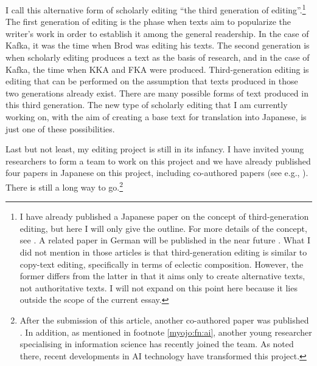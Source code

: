 \documentclass{article}
\begin{document}
I call this alternative form of scholarly editing ``the third generation
of editing''.\footnote{I have already published a Japanese paper on the
  concept of third-generation editing, but here I will only give the
  outline. For more details of the concept, see \cite{myojo_daisansedai_2021}. A related paper in German will be published in the near future \citep[see][]{myojo_editionspraxis_forthcoming}. What I did
  not mention in those articles is that third-generation editing is
  similar to copy-text editing, specifically in terms of eclectic
  composition. However, the former differs from the latter in that it
  aims only to create alternative texts, not authoritative texts. I will
  not expand on this point here because it lies outside the scope of the
  current essay.} The first generation of editing is the phase when
texts aim to popularize the writer's work in order to establish it among
the general readership. In the case of Kafka, it was the time when Brod
was editing his texts. The second generation is when scholarly
editing produces a text as the basis of research, and in the case of
Kafka, the time when KKA and FKA were produced. Third-generation editing
is editing that can be performed on the assumption that texts produced
in those two generations already exist. There are many possible forms of
text produced in this third generation. The new type of scholarly
editing that I am currently working on, with the aim of creating a base
text for translation into Japanese, is just one of these possibilities.

Last but not least, my editing project is still in its infancy. I have
invited young researchers to form a team to work on this project and we
have already published four papers in Japanese on this project,
including co-authored papers (see e.g., \cite{myojo_honyakukano_2019,myojo_taiho_2021}).
There is still a long way to go.\footnote{After the submission of this article, another co-authored paper was published \citep[see][]{myojo_grubach_2022}. In addition, as mentioned in footnote \ref{myojo:fn:ai}, another young researcher specialising in information science has recently joined the team. As noted there, recent developments in AI technology have transformed this project.}
\end{document}
